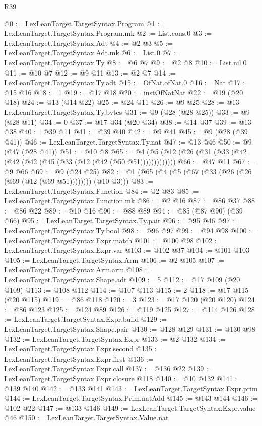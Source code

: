 \begin{lexlean}{R39}
\begin{coremodule}
@0 := LexLeanTarget.TargetSyntax.Program
@1 := LexLeanTarget.TargetSyntax.Program.mk
@2 := List.cons.{0}
@3 := LexLeanTarget.TargetSyntax.Adt
@4 := @2 @3
@5 := LexLeanTarget.TargetSyntax.Adt.mk
@6 := List.{0}
@7 := LexLeanTarget.TargetSyntax.Ty
@8 := @6 @7
@9 := @2 @8
@10 := List.nil.{0}
@11 := @10 @7
@12 := @9 @11
@13 := @2 @7
@14 := LexLeanTarget.TargetSyntax.Ty.adt
@15 := OfNat.ofNat.{0}
@16 := Nat
@17 := @15 @16
@18 := 1
@19 := @17 @18
@20 := instOfNatNat
@22 := @19 (@20 @18)
@24 := @13 (@14 @22)
@25 := @24 @11
@26 := @9 @25
@28 := @13 LexLeanTarget.TargetSyntax.Ty.bytes
@31 := @9 (@28 (@28 @25))
@33 := @9 (@28 @11)
@34 := 0
@37 := @17 @34 (@20 @34)
@38 := @14 @37
@39 := @13 @38
@40 := @39 @11
@41 := @39 @40
@42 := @9 @41
@45 := @9 (@28 (@39 @41))
@46 := LexLeanTarget.TargetSyntax.Ty.nat
@47 := @13 @46
@50 := @9 (@47 (@28 @41))
@51 := @10 @8
@65 := @4 (@5 (@12 (@26 (@31 (@33 (@42 (@42 (@42 (@45 (@33 (@12 (@42 (@50 @51)))))))))))))
@66 := @47 @11
@67 := @9 @66
@69 := @9 (@24 @25)
@82 := @1 (@65 (@4 (@5 (@67 (@33 (@26 (@26 (@69 (@12 (@69 @51)))))))) (@10 @3)))
@83 := LexLeanTarget.TargetSyntax.Function
@84 := @2 @83
@85 := LexLeanTarget.TargetSyntax.Function.mk
@86 := @2 @16
@87 := @86 @37
@88 := @86 @22
@89 := @10 @16
@90 := @88 @89
@94 := @85 (@87 @90) (@39 @66)
@95 := LexLeanTarget.TargetSyntax.Ty.pair
@96 := @95 @46
@97 := LexLeanTarget.TargetSyntax.Ty.bool
@98 := @96 @97
@99 := @94 @98
@100 := LexLeanTarget.TargetSyntax.Expr.match
@101 := @100 @98
@102 := LexLeanTarget.TargetSyntax.Expr.var
@103 := @102 @37
@104 := @101 @103
@105 := LexLeanTarget.TargetSyntax.Arm
@106 := @2 @105
@107 := LexLeanTarget.TargetSyntax.Arm.arm
@108 := LexLeanTarget.TargetSyntax.Shape.adt
@109 := 5
@112 := @17 @109 (@20 @109)
@113 := @108 @112
@114 := @107 @113
@115 := 2
@118 := @17 @115 (@20 @115)
@119 := @86 @118
@120 := 3
@123 := @17 @120 (@20 @120)
@124 := @86 @123
@125 := @124 @89
@126 := @119 @125
@127 := @114 @126
@128 := LexLeanTarget.TargetSyntax.Expr.build
@129 := LexLeanTarget.TargetSyntax.Shape.pair
@130 := @128 @129
@131 := @130 @98
@132 := LexLeanTarget.TargetSyntax.Expr
@133 := @2 @132
@134 := LexLeanTarget.TargetSyntax.Expr.second
@135 := LexLeanTarget.TargetSyntax.Expr.first
@136 := LexLeanTarget.TargetSyntax.Expr.call
@137 := @136 @22
@139 := LexLeanTarget.TargetSyntax.Expr.closure @118
@140 := @10 @132
@141 := @139 @140
@142 := @133 @141
@143 := LexLeanTarget.TargetSyntax.Expr.prim
@144 := LexLeanTarget.TargetSyntax.Prim.natAdd
@145 := @143 @144
@146 := @102 @22
@147 := @133 @146
@149 := LexLeanTarget.TargetSyntax.Expr.value @46
@150 := LexLeanTarget.TargetSyntax.Value.nat

\end{coremodule}
\end{lexlean}
